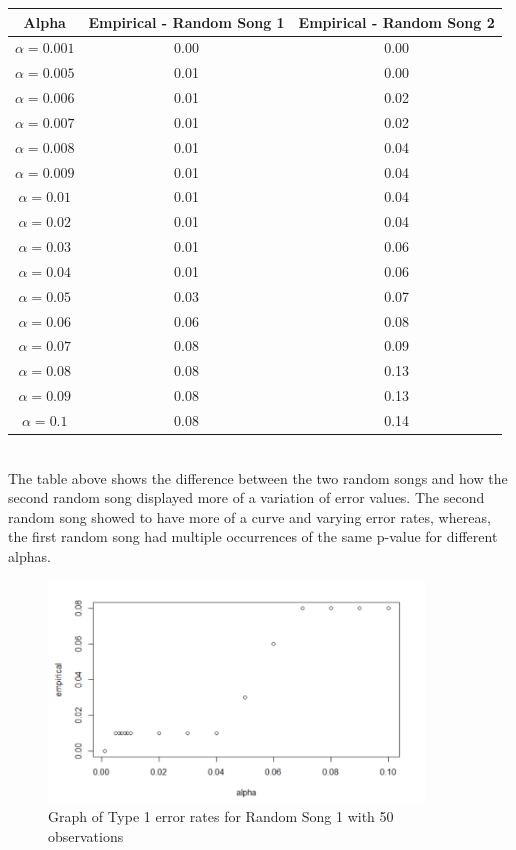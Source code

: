 \documentclass[12pt, letterpaper]{article}
\begin{document}
\begin{tabular}{|c|c|c|}
\hline
\textbf{Alpha} & \textbf{Empirical - Random Song 1} & \textbf{Empirical - Random Song 2} \\
\hline
$\alpha = 0.001$ & 0.00 & 0.00\\
$\alpha = 0.005$ &  0.01 & 0.00\\
$\alpha = 0.006$ &  0.01 & 0.02\\
$\alpha = 0.007$ & 0.01 & 0.02\\
$\alpha = 0.008$ & 0.01 & 0.04\\
$\alpha = 0.009$ & 0.01 & 0.04\\
$\alpha = 0.01$ & 0.01 & 0.04\\
$\alpha = 0.02$ & 0.01 & 0.04\\
$\alpha = 0.03$ & 0.01 & 0.06\\
$\alpha = 0.04$ & 0.01 & 0.06\\
$\alpha = 0.05$ &  0.03 & 0.07\\
$\alpha = 0.06$ &  0.06 & 0.08\\
$\alpha = 0.07$ &  0.08 & 0.09\\
$\alpha = 0.08$ &  0.08 & 0.13\\
$\alpha = 0.09$ & 0.08 & 0.13\\
$\alpha = 0.1$ & 0.08 & 0.14\\
\hline
\end{tabular} \\

The table above shows the difference between the two random songs and how the second random song displayed more of a variation of error values.  The second random song showed to have more of a curve and varying error rates, whereas, the first random song had multiple occurrences of the same p-value for different alphas. 

\begin{figure}[!hb]
\centering
\includegraphics[width=10cm]{Type1_Song1.png}
\caption{Graph of Type 1 error rates for Random Song 1 with 50 observations}
\label{fig: Type 1 Error, Song 1, n=50}
\end{figure}
\end{document}
